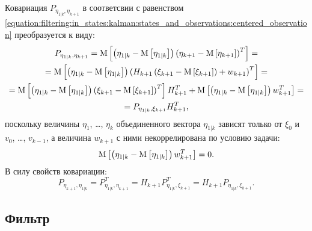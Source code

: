 Ковариация $P_{\eta_{1|k}, \eta_{k+1}}$ в соответсвии с равенством \eqref{equation:filtering:in_states:kalman:states_and_observations:centered_observation} преобразуется к виду:
\begin{multline} \label{equation:filtering:in_states:kalman:states_and_observations:observations_and_observation_covariance}
	P_{\eta_{1|k}, \eta_{k+1}}
		= \mathrm{M} \left [ \left ( \eta_{1|k} - \mathrm{M} \left [ \eta_{1|k} \right ] \right ) \left ( \eta_{k+1} - \mathrm{M} \left [ \eta_{k+1} \right ] \right )^T \right ] = \\
	= \mathrm{M} \left [ \left ( \eta_{1|k} - \mathrm{M} \left [ \eta_{1|k} \right ] \right ) \left ( H_{k+1} \left ( \xi_{k+1} - \mathrm{M} \left [ \xi_{k+1} \right ] \right ) + w_{k+1} \right )^T \right ] = \\
	= \mathrm{M} \left [ \left ( \eta_{1|k} - \mathrm{M} \left [ \eta_{1|k} \right ] \right ) \left ( \xi_{k+1} - \mathrm{M} \left [ \xi_{k+1} \right ] \right )^T \right ] H_{k+1}^T
		+ \mathrm{M} \left [ \left ( \eta_{1|k} - \mathrm{M} \left [ \eta_{1|k} \right ] \right ) w_{k+1}^T \right ] = \\
	= P_{\eta_{1|k}, \xi_{k+1}} H_{k+1}^T
	,
\end{multline}
поскольку величины $\eta_1$, \dots, $\eta_k$ объединенного вектора $\eta_{1|k}$ зависят только от $\xi_0$ и $v_0$, \dots, $v_{k-1}$, а величина $w_{k+1}$ с ними
некоррелирована по условию задачи:
$$
	\mathrm{M} \left [ \left ( \eta_{1|k} - \mathrm{M} \left [ \eta_{1|k} \right ] \right ) w_{k+1}^T \right ] = 0.
$$
В силу свойств ковариации:
\begin{equation} \label{equation:filtering:in_states:kalman:states_and_observations:observation_and_observations_covariance}
	P_{\eta_{k+1}, \eta_{1|k}}
		= P_{\eta_{1|k}, \eta_{k+1}}^T
		= H_{k+1} P_{\eta_{1|k}, \xi_{k+1}}^T
		= H_{k+1} P_{\eta_{1|k}, \xi_{k+1}}
	.
\end{equation}

\subsection{Фильтр}~\label{subsection:filtering:in_states:kalman:recursion}

